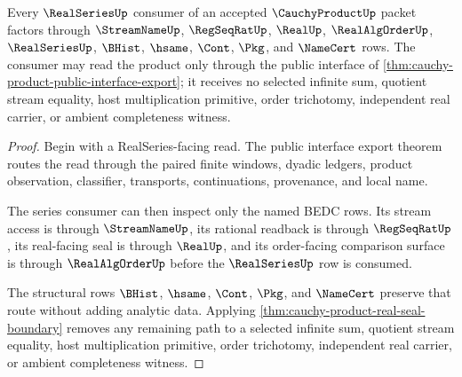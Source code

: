 \begin{theorem}
\label{thm:cauchy-product-real-series-consumer-boundary}
Every $\RealSeriesUp$ consumer of an accepted $\CauchyProductUp$ packet factors through $\StreamNameUp$, $\RegSeqRatUp$, $\RealUp$, $\RealAlgOrderUp$, $\RealSeriesUp$, $\BHist$, $\hsame$, $\Cont$, $\Pkg$, and $\NameCert$ rows. The consumer may read the product only through the public interface of \autoref{thm:cauchy-product-public-interface-export}; it receives no selected infinite sum, quotient stream equality, host multiplication primitive, order trichotomy, independent real carrier, or ambient completeness witness.
\end{theorem}
\begin{proof}
Begin with a RealSeries-facing read. The public interface export theorem routes the read through the paired finite windows, dyadic ledgers, product observation, classifier, transports, continuations, provenance, and local name.

The series consumer can then inspect only the named BEDC rows. Its stream access is through $\StreamNameUp$, its rational readback is through $\RegSeqRatUp$, its real-facing seal is through $\RealUp$, and its order-facing comparison surface is through $\RealAlgOrderUp$ before the $\RealSeriesUp$ row is consumed.

The structural rows $\BHist$, $\hsame$, $\Cont$, $\Pkg$, and $\NameCert$ preserve that route without adding analytic data. Applying \autoref{thm:cauchy-product-real-seal-boundary} removes any remaining path to a selected infinite sum, quotient stream equality, host multiplication primitive, order trichotomy, independent real carrier, or ambient completeness witness.
\end{proof}

